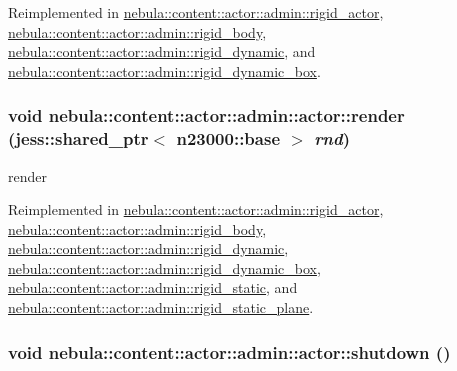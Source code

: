 Reimplemented in \hyperlink{classnebula_1_1content_1_1actor_1_1admin_1_1rigid__actor_a633100102ba359becd477f46159270de}{nebula::content::actor::admin::rigid\_\-actor}, \hyperlink{classnebula_1_1content_1_1actor_1_1admin_1_1rigid__body_a7ed8ba2a35fdf83cf508fe37fde0d875}{nebula::content::actor::admin::rigid\_\-body}, \hyperlink{classnebula_1_1content_1_1actor_1_1admin_1_1rigid__dynamic_accf38f3f07acdbe924c46388230d2e99}{nebula::content::actor::admin::rigid\_\-dynamic}, and \hyperlink{classnebula_1_1content_1_1actor_1_1admin_1_1rigid__dynamic__box_aeed451b7d00e75948f474e4bb20404ba}{nebula::content::actor::admin::rigid\_\-dynamic\_\-box}.\hypertarget{classnebula_1_1content_1_1actor_1_1admin_1_1actor_a1f4c2d9c8967293cad22dd8986e4886c}{
\subsubsection[{render}]{\setlength{\rightskip}{0pt plus 5cm}void nebula::content::actor::admin::actor::render (jess::shared\_\-ptr$<$ {\bf n23000::base} $>$ {\em rnd})}}
\label{classnebula_1_1content_1_1actor_1_1admin_1_1actor_a1f4c2d9c8967293cad22dd8986e4886c}


render 

Reimplemented in \hyperlink{classnebula_1_1content_1_1actor_1_1admin_1_1rigid__actor_a2d1920022481d1e32da69c777ce73541}{nebula::content::actor::admin::rigid\_\-actor}, \hyperlink{classnebula_1_1content_1_1actor_1_1admin_1_1rigid__body_a88b9c26608737c7850b4eef227548a59}{nebula::content::actor::admin::rigid\_\-body}, \hyperlink{classnebula_1_1content_1_1actor_1_1admin_1_1rigid__dynamic_a891dd9d18ef100af72427ebaea9e473a}{nebula::content::actor::admin::rigid\_\-dynamic}, \hyperlink{classnebula_1_1content_1_1actor_1_1admin_1_1rigid__dynamic__box_a7e5e4c2e52b7b02c7d667cb74926e8a2}{nebula::content::actor::admin::rigid\_\-dynamic\_\-box}, \hyperlink{classnebula_1_1content_1_1actor_1_1admin_1_1rigid__static_a574621febd60cbfd2949c00430d7f5f3}{nebula::content::actor::admin::rigid\_\-static}, and \hyperlink{classnebula_1_1content_1_1actor_1_1admin_1_1rigid__static__plane_ac4b170a8bd046d8a9b8822cfd9ce89e5}{nebula::content::actor::admin::rigid\_\-static\_\-plane}.\hypertarget{classnebula_1_1content_1_1actor_1_1admin_1_1actor_a99f23953573c4f96672d9fb7b3cfe4fb}{
\subsubsection[{shutdown}]{\setlength{\rightskip}{0pt plus 5cm}void nebula::content::actor::admin::actor::shutdown ()}}
\label{classnebula_1_1content_1_1actor_1_1admin_1_1actor_a99f23953573c4f96672d9fb7b3cfe4fb}


